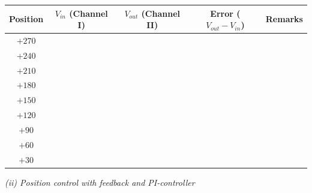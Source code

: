 \begin{procedure}
  \needspace{4cm}
  \begin{boxedtable}
    \label{tab:exp2-table1}
    {\renewcommand{\arraystretch}{1.5}%
      \centering
      \begin{tabular}{|c|c|c|c|c|}
        \hline
        Position & $V_{in}$ (Channel I) & $V_{out}$ (Channel II) & Error ($V_{out}-V_{in}$) & Remarks \\
        \hline
        $+270$   &                      &                        &                          &         \\
        \hline
        $+240$   &                      &                        &                          &         \\
        \hline
        $+210$   &                      &                        &                          &         \\
        \hline
        $+180$   &                      &                        &                          &         \\
        \hline
        $+150$   &                      &                        &                          &         \\
        \hline
        $+120$   &                      &                        &                          &         \\
        \hline
        $+90$    &                      &                        &                          &         \\
        \hline
        $+60$    &                      &                        &                          &         \\
        \hline
        $+30$    &                      &                        &                          &         \\
        \hline
      \end{tabular}
    }
  \end{boxedtable}
  \vspace*{1em}

  \textit{(ii) Position control with feedback and PI-controller}\vspace{2pt}


\end{procedure}
